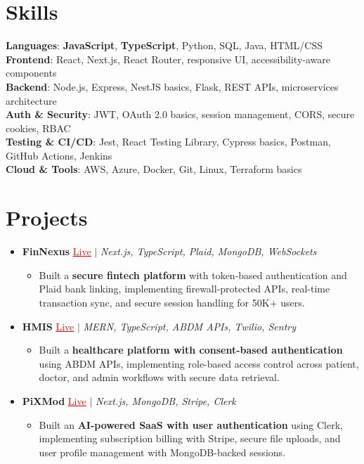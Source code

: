 \documentclass[letterpaper,10pt]{article}
\newcommand{\resumeItem}[1]{\item\small{{#1 \vspace{-2pt}}}}
\newcommand{\resumeProjectHeading}[1]{\item \small #1 \vspace{-2pt}}
\newcommand{\resumeSubHeadingListStart}{\begin{itemize}[leftmargin=0.0in, label={}]}
\newcommand{\resumeSubHeadingListEnd}{\end{itemize}}
\newcommand{\resumeProjItemListStart}{\begin{itemize}[leftmargin=0.15in,label=\textbullet,itemsep=0pt,topsep=0pt,parsep=0pt,partopsep=0pt]}
\newcommand{\resumeProjItemListEnd}{\end{itemize}\vspace{-4pt}}
\begin{document}
\section{Skills}
\begin{itemize}[leftmargin=0.15in, label={}]
\small{\item{
\textbf{Languages}: \textbf{JavaScript}, \textbf{TypeScript}, Python, SQL, Java, HTML/CSS \\
\textbf{Frontend}: React, Next.js, React Router, responsive UI, accessibility-aware components \\
\textbf{Backend}: Node.js, Express, NestJS basics, Flask, REST APIs, microservices architecture \\
\textbf{Auth \& Security}: JWT, OAuth 2.0 basics, session management, CORS, secure cookies, RBAC \\
\textbf{Testing \& CI/CD}: Jest, React Testing Library, Cypress basics, Postman, GitHub Actions, Jenkins \\
\textbf{Cloud \& Tools}: AWS, Azure, Docker, Git, Linux, Terraform basics
}}
\end{itemize}
\vspace{-16pt}
\section{Projects}
\resumeSubHeadingListStart
\vspace{-2pt}
\resumeProjectHeading{\textbf{FinNexus} {\href{https://fin-nexus.vercel.app/}{\textcolor{red}{\underline{Live}}}} $|$ \emph{Next.js, TypeScript, Plaid, MongoDB, WebSockets}}
\resumeProjItemListStart
\resumeItem{Built a \textbf{secure fintech platform} with token-based authentication and Plaid bank linking, implementing firewall-protected APIs, real-time transaction sync, and secure session handling for 50K+ users.}
\resumeProjItemListEnd
\vspace{3pt}
\resumeProjectHeading{\textbf{HMIS} {\href{https://hims-rouge.vercel.app/}{\textcolor{red}{\underline{Live}}}} $|$ \emph{MERN, TypeScript, ABDM APIs, Twilio, Sentry}}
\resumeProjItemListStart
\resumeItem{Built a \textbf{healthcare platform with consent-based authentication} using ABDM APIs, implementing role-based access control across patient, doctor, and admin workflows with secure data retrieval.}
\resumeProjItemListEnd
\vspace{3pt}
\resumeProjectHeading{\textbf{PiXMod} {\href{https://pixmod.vercel.app/}{\textcolor{red}{\underline{Live}}}} $|$ \emph{Next.js, MongoDB, Stripe, Clerk}}
\resumeProjItemListStart
\resumeItem{Built an \textbf{AI-powered SaaS with user authentication} using Clerk, implementing subscription billing with Stripe, secure file uploads, and user profile management with MongoDB-backed sessions.}
\resumeProjItemListEnd
\resumeSubHeadingListEnd
\end{document}
